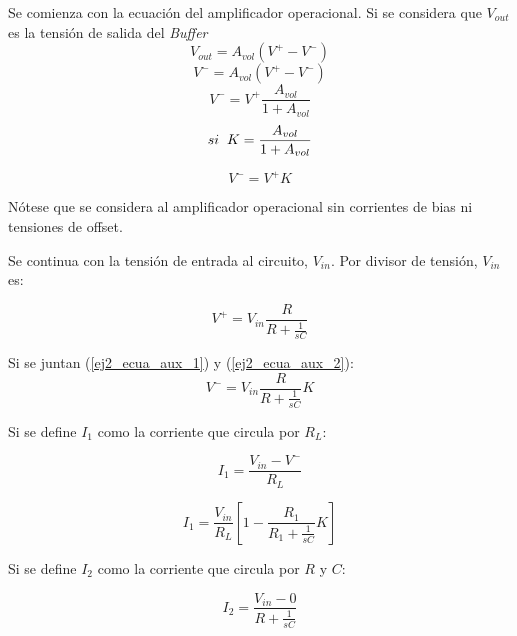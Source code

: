 \documentclass[12pt,a4paper]{article}
\begin{document}
Se comienza con la ecuación del amplificador operacional. Si se considera que $V_{out}$ es la tensión de salida del \textit{Buffer}
\begin{displaymath} V_{out} = A_{vol} (V^+ - V^-) \end{displaymath}
\begin{displaymath} V^- = A_{vol} (V^+ - V^-) \end{displaymath}
\begin{displaymath} V^- = V^+\frac{A_{vol}}{1+A_{vol}} \end{displaymath}  
\begin{displaymath}  si \hspace{2mm} K = \frac{A_{vol}}{1+A_{vol}} \end{displaymath} 

\begin{equation} V^- = V^+K \label{ej2_ecua_aux_1}\end{equation}


Nótese que se considera al amplificador operacional sin corrientes de bias ni tensiones de offset.

Se continua con la tensión de entrada al circuito, $V_{in}$. Por divisor de tensión, $V_{in}$ es:

\begin{equation} V^+ = V_{in} \frac{R}{R+\frac{1}{sC}} \label{ej2_ecua_aux_2}\end{equation}

Si se juntan (\ref{ej2_ecua_aux_1}) y (\ref{ej2_ecua_aux_2}):
\begin{displaymath} V^- = V_{in} \frac{R}{R+\frac{1}{sC}} K \end{displaymath}

Si se define $I_1$ como la corriente que circula por $R_L$:

\begin{displaymath} I_1 = \frac{V_{in} - V^-}{R_L} \end{displaymath}

\begin{displaymath} I_1 = \frac{V_{in}}{R_L}[1-\frac{R_1}{R_1 + \frac{1}{sC}}K] \end{displaymath}

Si se define $I_2$ como la corriente que circula por $R$ y $C$:    

\begin{displaymath} I_2 = \frac{V_{in} - 0}{R + \frac{1}{sC}} \end{displaymath}
\end{document}
